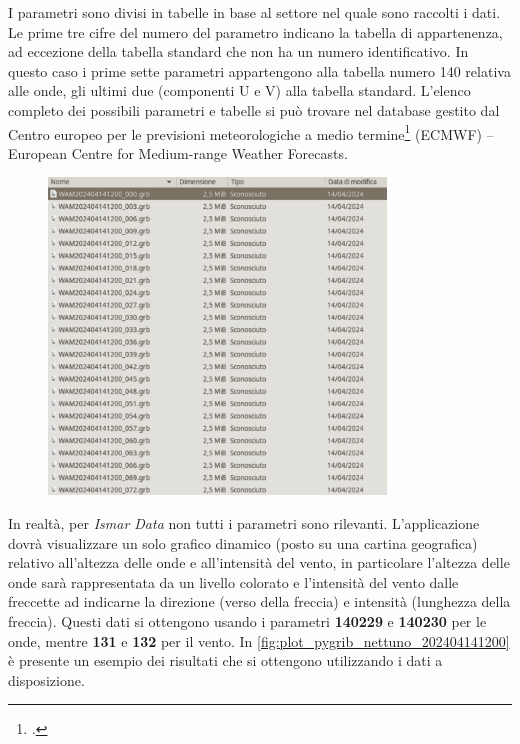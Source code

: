 \documentclass[./main.tex]{subfiles}
\begin{document}
I parametri sono divisi in tabelle in base al settore nel quale sono raccolti i dati. Le prime tre cifre del numero del parametro indicano la tabella di appartenenza, ad eccezione della tabella standard che non ha un numero identificativo.  In questo caso i prime sette parametri appartengono alla tabella numero 140 relativa alle onde, gli ultimi due (componenti U e V) alla tabella standard. L'elenco completo dei possibili parametri e tabelle si può trovare nel database gestito dal Centro europeo per le previsioni meteorologiche a medio termine\footcite[\url{https://codes.ecmwf.int/grib/param-db/?encoding=grib1}]{website-ecmwf-grib} (ECMWF) -- European Centre for Medium-range Weather Forecasts. \par


\begin{figure}[!ht]
\noindent \begin{minipage}{\textwidth}
\vspace{1cm}
\centering
\includegraphics[width=0.8\textwidth]{images/thunar_GRIB_nettuno_14042024.pdf}
\captionsetup{font=small, hypcap=false}
\label{fig:thunar_GRIB_nettuno_14042024}
\end{minipage}
\vspace{0.25cm}
\end{figure}

In realtà, per \textit{Ismar Data} non tutti i parametri sono rilevanti. L'applicazione dovrà visualizzare un solo grafico dinamico (posto su una cartina geografica) relativo all'altezza delle onde e all'intensità del vento, in particolare l'altezza delle onde sarà rappresentata da un livello colorato e l'intensità del vento dalle freccette ad indicarne la direzione (verso della freccia) e intensità (lunghezza della freccia). Questi dati si ottengono usando i parametri \textbf{140229} e \textbf{140230} per le onde, mentre \textbf{131} e \textbf{132} per il vento. In \autoref{fig:plot_pygrib_nettuno_202404141200} è presente un esempio dei risultati che si ottengono utilizzando i dati a disposizione.\par
\end{document}
